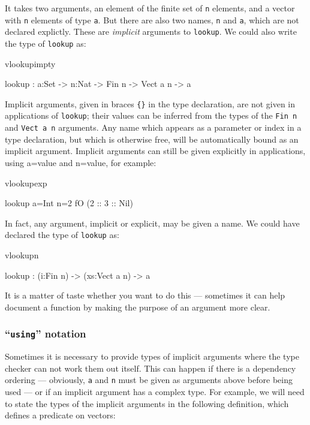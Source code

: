 \noindent
It takes two arguments, an element of the finite set of \texttt{n} elements, and a vector
with \texttt{n} elements of type \texttt{a}. But there are also two names, 
\texttt{n} and \texttt{a}, which are not declared explictly. These are \emph{implicit}
arguments to \texttt{lookup}. We could also write the type of \texttt{lookup} as:

\begin{SaveVerbatim}{vlookupimpty}

lookup : {a:Set} -> {n:Nat} -> Fin n -> Vect a n -> a

\end{SaveVerbatim}

\noindent
Implicit arguments, given in braces \texttt{\{\}} in the type declaration, are not given in
applications of \texttt{lookup}; their values can be inferred from the types of
the \texttt{Fin n} and \texttt{Vect a n} arguments. Any name which appears as a parameter
or index in a type declaration, but which is otherwise free, will be automatically
bound as an implicit argument.
Implicit arguments can still be given explicitly in applications, using
{a=value} and {n=value}, for example:

\begin{SaveVerbatim}{vlookupexp}

lookup {a=Int} {n=2} fO (2 :: 3 :: Nil)

\end{SaveVerbatim}

\noindent
In fact, any argument, implicit or explicit, may be given a name. We could have
declared the type of \texttt{lookup} as:

\begin{SaveVerbatim}{vlookupn}

lookup : (i:Fin n) -> (xs:Vect a n) -> a

\end{SaveVerbatim}

\noindent
It is a matter of taste whether you want to do this --- sometimes it can help
document a function by making the purpose of an argument more clear.

\subsubsection{``\texttt{using}'' notation}

Sometimes it is necessary to provide types of implicit arguments where
the type checker can not work them out itself. This can happen if there is a
dependency ordering --- obviously, \texttt{a} and \texttt{n} must be given as arguments above
before being used --- or if an implicit argument has a complex type. For example,
we will need to state the types of the implicit arguments in the following
definition, which defines a predicate on vectors:

